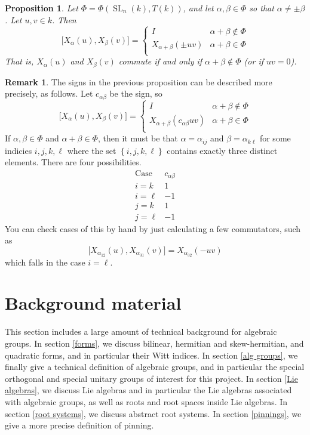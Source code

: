 \documentclass[12pt]{article}
\newtheorem{proposition}[theorem]{Proposition}
\theoremstyle{definition}
\newtheorem{remark}[theorem]{Remark}
\numberwithin{theorem}{subsection}
\newcommand{\lb}{\left\{}
\newcommand{\rb}{\right\}}
\DeclareMathOperator{\SL}{SL}
\begin{document}
\begin{proposition}
Let $\Phi = \Phi(\SL_n(k), T(k))$, and let $\alpha, \beta \in \Phi$ so that $\alpha \neq \pm \beta$. Let $u,v \in k$. Then
\[
	\Big[ X_\alpha(u), X_\beta(v) \Big] =
	\begin{cases}
		I & \alpha+\beta \not \in \Phi \\
		X_{\alpha+\beta}( \pm uv) & \alpha+\beta \in \Phi \\
	\end{cases}
\]
That is, $X_\alpha(u)$ and $X_\beta(v)$ commute if and only if $\alpha+\beta \not \in \Phi$ (or if $uv = 0$). 
\end{proposition}

\begin{remark}
The signs in the previous proposition can be described more precisely, as follows. Let $c_{\alpha \beta}$ be the sign, so
\[
	\Big[ X_\alpha(u), X_\beta(v) \Big] =
	\begin{cases}
		I & \alpha+\beta \not \in \Phi \\
		X_{\alpha+\beta}( c_{\alpha \beta} uv) & \alpha+\beta \in \Phi \\
	\end{cases}
\]
If $\alpha, \beta \in \Phi$ and $\alpha+\beta \in \Phi$, then it must be that $\alpha = \alpha_{ij}$ and $\beta = \alpha_{k\ell}$ for some indicies $i,j,k,\ell$ where the set $\lb i,j,k,\ell \rb$ contains exactly three distinct elements. There are four possibilities.
\[
	\begin{array}{l|r}
		\text{Case} & c_{\alpha \beta} \\
		\hline
		i = k &   1 \\
		i = \ell & -1 \\
		j = k & 1 \\
		j = \ell & -1
	\end{array}
\]
You can check cases of this by hand by just calculating a few commutators, such as
\[
	\Big[ X_{\alpha_{12}}(u), X_{\alpha_{31}}(v) \Big] = X_{\alpha_{32}}(-uv)
\]
which falls in the case $i = \ell$.
\end{remark}

\newpage

\section{Background material}

This section includes a large amount of technical background for algebraic groups. In section \ref{forms}, we discuss bilinear, hermitian and skew-hermitian, and quadratic forms, and in particular their Witt indices. In section \ref{alg groups}, we finally give a technical definition of algebraic groups, and in particular the special orthogonal and special unitary groups of interest for this project. In section \ref{Lie algebras}, we discuss Lie algebras and in particular the Lie algebras associated with algebraic groups, as well as roots and root spaces inside Lie algebras. In section \ref{root systems}, we discuss abstract root systems. In section \ref{pinnings}, we give a more precise definition of pinning. 
\end{document}
